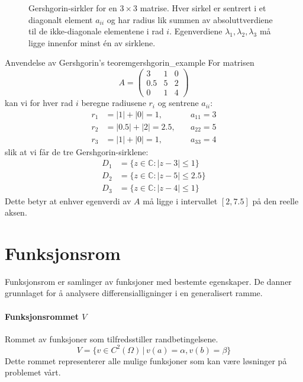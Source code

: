 \documentclass[../main.tex]{subfiles}
\begin{document}
\begin{figure}
	\centering
	
	\caption{Gershgorin-sirkler for en $3 \times 3$ matrise. Hver sirkel er sentrert i et diagonalt element $a_{ii}$ og har radius lik summen av absoluttverdiene til de ikke-diagonale elementene i rad $i$. Egenverdiene $\lambda_1, \lambda_2, \lambda_3$ må ligge innenfor minst én av sirklene.}
	\label{fig:gershgorin}
\end{figure}

\begin{example}{Anvendelse av Gershgorin's teorem}{gershgorin_example}
	For matrisen
	\[
		A = \begin{pmatrix} 3 & 1 & 0 \\ 0.5 & 5 & 2 \\ 0 & 1 & 4 \end{pmatrix}
	\]
	kan vi for hver rad $i$ beregne radiusene $r_i$ og sentrene $a_{ii}$:
	\begin{align*}
		r_1 & = |1| + |0| = 1,     & \quad a_{11} = 3 \\
		r_2 & = |0.5| + |2| = 2.5, & \quad a_{22} = 5 \\
		r_3 & = |1| + |0| = 1,     & \quad a_{33} = 4
	\end{align*}
	slik at vi får de tre Gershgorin-sirklene:
	\begin{align*}
		D_1 & = \{z \in \mathbb{C} : |z - 3| \leq 1\}   \\
		D_2 & = \{z \in \mathbb{C} : |z - 5| \leq 2.5\} \\
		D_3 & = \{z \in \mathbb{C} : |z - 4| \leq 1\}
	\end{align*}
	Dette betyr at enhver egenverdi av $A$ må ligge i intervallet $[2,7.5]$ på den reelle aksen.
\end{example}


\section{Funksjonsrom}
Funksjonsrom er samlinger av funksjoner med bestemte egenskaper. De danner grunnlaget for å analysere differensialligninger i en generalisert ramme.

\paragraph{Funksjonsrommet \(V\)} Rommet av funksjoner som tilfredsstiller randbetingelsene.
\[ V = \{ v \in C^2(\Omega) \, | \, v(a) = \alpha, v(b) = \beta \} \]
Dette rommet representerer alle mulige funksjoner som kan være løsninger på problemet vårt.
\end{document}
